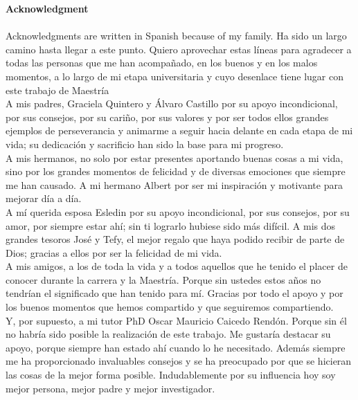\textbf{\LARGE Acknowledgment}\\\\

Acknowledgments are written in Spanish because of my family. Ha sido un largo camino hasta llegar a este punto. Quiero aprovechar estas l\'ineas para agradecer a todas las personas que me han acompa\~nado, en los buenos y en los malos momentos, a lo largo de mi etapa universitaria y cuyo desenlace tiene lugar con este trabajo de Maestr\'ia\\

A mis padres, Graciela Quintero y \'Alvaro Castillo por su apoyo incondicional, por sus consejos, por su cari\~no, por sus valores y por ser todos ellos grandes ejemplos de perseverancia y animarme a seguir hacia delante en cada etapa de mi vida; su dedicaci\'on y sacrificio han sido la base para mi progreso. \\

A mis hermanos, no solo por estar presentes aportando buenas cosas a mi vida, sino por los grandes momentos de felicidad y de diversas emociones que siempre me han causado. A mi hermano Albert por ser mi inspiraci\'on y motivante para mejorar d\'ia a d\'ia.\\

A m\'i querida esposa Esledin por su apoyo incondicional, por sus consejos, por su amor, por siempre estar ah\'i; sin ti lograrlo hubiese sido m\'as dif\'icil. A mis dos grandes tesoros Jos\'e y Tefy, el mejor regalo que haya podido recibir de parte de Dios; gracias a ellos por ser la felicidad de mi vida.\\

A mis amigos, a los de toda la vida y a todos aquellos que he tenido el placer de conocer durante la carrera y la Maestr\'ia. Porque sin ustedes estos a\~nos no tendr\'ian el significado que han tenido para m\'i. Gracias por todo el apoyo y por los buenos momentos que hemos compartido y que seguiremos compartiendo.\\

Y, por supuesto, a mi tutor PhD Oscar Mauricio Caicedo Rend\'on. Porque sin \'el no habr\'ia sido posible la realizaci\'on de este trabajo. Me gustar\'ia destacar su apoyo, porque siempre han estado ah\'i cuando lo he necesitado. Adem\'as siempre me ha proporcionado invaluables consejos y se ha preocupado por que se hicieran las cosas de la mejor forma posible. Indudablemente por su influencia hoy soy mejor persona, mejor padre y mejor investigador.
